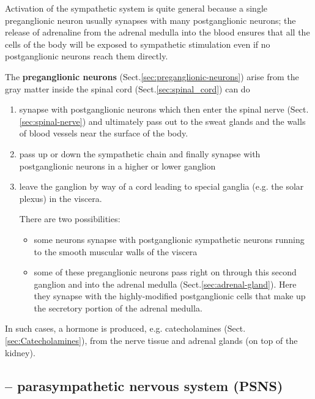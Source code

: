 Activation of the sympathetic system is quite general because a single
preganglionic neuron usually synapses with many postganglionic neurons; the
release of adrenaline from the adrenal medulla into the blood ensures that all
the cells of the body will be exposed to sympathetic stimulation even if no
postganglionic neurons reach them directly.

The {\bf preganglionic neurons} (Sect.\ref{sec:preganglionic-neurons}) arise
from the gray matter inside the spinal cord (Sect.\ref{sec:spinal_cord}) can do
\begin{enumerate}
  
  \item synapse with postganglionic neurons which then enter the spinal nerve
  (Sect.\ref{sec:spinal-nerve}) and ultimately pass out to the sweat glands and the
  walls of blood vessels near the surface of the body.
  
  
  \item pass up or down the sympathetic chain and finally synapse with
  postganglionic neurons in a higher or lower ganglion
  
  \item leave the ganglion by way of a cord leading to special ganglia (e.g. the
  solar plexus) in the viscera. 
  
  There are two possibilities: 
  \begin{itemize}
    \item some neurons synapse with postganglionic
  sympathetic neurons running to the smooth muscular walls of the viscera
  
    \item some of these preganglionic neurons pass right on through this second
  ganglion and into the adrenal medulla (Sect.\ref{sec:adrenal-gland}). Here
  they synapse with the highly-modified postganglionic cells that make up the secretory portion of the
  adrenal medulla.
    \end{itemize}
   
\end{enumerate}

In such cases, a hormone is produced, e.g. catecholamines
(Sect.\ref{sec:Catecholamines}), from the nerve tissue and adrenal glands (on
top of the kidney). 



\subsection{-- parasympathetic nervous system (PSNS)}
\label{sec:parasympathetic_nervous_system}

